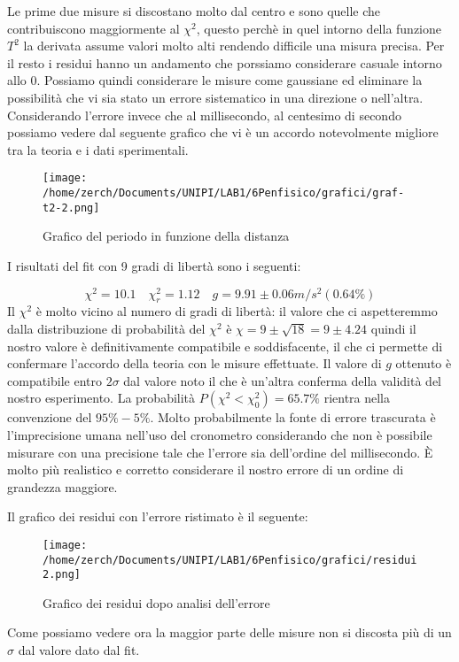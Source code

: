 \documentclass[a4paper,10pt]{article}
\begin{document}
Le prime due misure si discostano molto dal centro e sono quelle che contribuiscono maggiormente al $\chi^2$, questo perchè in quel intorno della funzione $T^2$ la derivata assume valori molto alti rendendo difficile una misura precisa. Per il resto i residui hanno un andamento che porssiamo considerare casuale intorno allo $0$. Possiamo quindi considerare le misure come gaussiane ed eliminare la possibilità che vi sia stato un errore sistematico in una direzione o nell'altra. 
Considerando l'errore invece che al millisecondo, al centesimo di secondo possiamo vedere dal seguente grafico che vi è un accordo notevolmente migliore tra la teoria e i dati sperimentali.
\begin{figure}[H]
 \centering
 \caption{Grafico del periodo in funzione della distanza}
 \texttt{[image: /home/zerch/Documents/UNIPI/LAB1/6Penfisico/grafici/graf-t2-2.png]}
\end{figure}

I risultati del fit con 9 gradi di libertà sono i seguenti:

\begin{equation}
\chi^2=10.1 \quad \chi^2_r=1.12 \quad g=9.91\pm0.06 m/s^2 (0.64\%)
\end{equation}
Il $\chi^2$ è molto vicino al numero di gradi di libertà: il valore che ci aspetteremmo dalla distribuzione di probabilità del $\chi^2$ è $\chi=9\pm\sqrt{18}=9\pm4.24$ quindi il nostro valore è definitivamente compatibile e soddisfacente, il che ci permette di confermare l'accordo della teoria con le misure effettuate. 
Il valore di $g$ ottenuto è compatibile entro $2\sigma$ dal valore noto il che è un'altra conferma della validità del nostro esperimento.
La probabilità $P(\chi^2<\chi^2_0)=65.7\%$ rientra nella convenzione del $95\%-5\%$.
Molto probabilmente la fonte di errore trascurata è l'imprecisione umana nell'uso del cronometro considerando che non è possibile misurare con una precisione tale che l'errore sia dell'ordine del millisecondo. È molto più realistico e corretto considerare il nostro errore di un ordine di grandezza maggiore.

Il grafico dei residui con l'errore ristimato è il seguente:

\begin{figure}[H]
 \centering
 \caption{Grafico dei residui dopo analisi dell'errore}
 \texttt{[image: /home/zerch/Documents/UNIPI/LAB1/6Penfisico/grafici/residui2.png]}
\end{figure}

Come possiamo vedere ora la maggior parte delle misure non si discosta più di un $\sigma$ dal valore dato dal fit.
\end{document}
